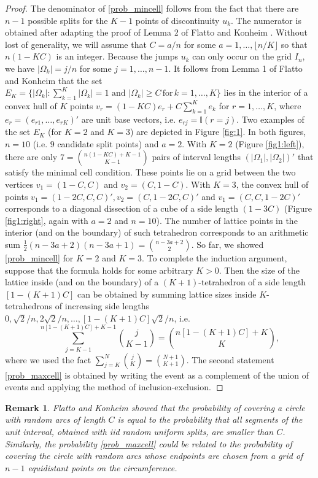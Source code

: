 \documentclass{article}
\newcommand{\1}{\mathbb{I}}
\newtheorem{remark}{Remark}[section]
\theoremstyle{assumption}
\begin{document}
\begin{proof}
The denominator of \eqref{prob_mincell} follows from the fact that there are $n-1$ possible splits for the $K-1$ points of discontinuity $u_k$.
The numerator is obtained after adapting the proof of Lemma 2 of Flatto and Konheim \cite{flatto_konheim}.
Without lost of generality, we will assume that $C=a/n$ for some $a=1,\dots,\lfloor n/K\rfloor$ so that $n(1-KC)$ is an integer. Because the  jumps $u_k$ can only occur on the grid $I_n$, we have
$|\Omega_k|=j/n$ for some $j=1,\dots,n-1$. It follows from Lemma 1 of Flatto and Konheim \cite{flatto_konheim} that the 
set $E_K=\{|\Omega_k|:\sum_{k=1}^{K}|\Omega_k|=1\,\,\text{and}\,\, |\Omega_k|\geq C\,\text{for}\,k=1,\dots,K\}$ lies in the interior of a convex hull of $K$ points
$v_r=(1-KC)e_r+C\sum_{k=1}^Ke_k$ for  $r=1,\dots, K$, where $e_r=(e_{r1},\dots,e_{rK})'$ are unit base vectors, i.e. $e_{rj}=\mathbb{I}(r=j)$.
Two examples of the set $E_K$ (for $K=2$ and $K=3$) are depicted in Figure \ref{fig:1}. In both figures,  $n=10$ (i.e. $9$ candidate split points)  and $a=2$. With $K=2$ (Figure \ref{fig1:left}),  there are  
only $7= {{n(1-KC)+K-1} \choose {K-1}}$ pairs of interval lengths $(|\Omega_1|,|\Omega_2|)'$ that satisfy the minimal cell condition. These points lie on a grid between the two vertices $v_1=(1-C,C)$ and $v_2=(C,1-C)$.
With $K=3$, the convex hull of points $v_1=(1-2C,C,C)',v_2=(C,1-2C,C)'$ and $v_1=(C,C,1-2C)'$ corresponds to a diagonal dissection of a cube of a side length $(1-3C)$ (Figure \ref{fig1:right}, again  with $a=2$ and $n=10$). 
The number of lattice points in the interior (and on the boundary) of such tetrahedron corresponds to an arithmetic sum $\frac{1}{2}{(n-3a+2)(n-3a+1)}={{n-3a+2}\choose 2}$. 
So far, we showed \eqref{prob_mincell} for $K=2$ and $K=3$.  To complete the induction argument, suppose that the formula holds for some arbitrary $K>0$.  Then  the size of the lattice inside (and on the boundary) of a 
$(K+1)$-tetrahedron of a side length $[1-(K+1)C]$ can be obtained by summing lattice sizes inside $K$-tetrahedrons of increasing side lengths {$0,\sqrt{2}/n, 2\sqrt{2}/n ,\dots,[1-(K+1)C]\sqrt{2}/n$}, i.e.
$$
\sum_{j=K-1}^{n[1-(K+1)C]+K-1}{j\choose K-1}={n[1-(K+1)C]+K \choose K},
$$
where we used the fact $\sum_{j=K}^N{j\choose K}={N+1 \choose K+1}$. The second statement \eqref{prob_maxcell} is obtained by writing the event as a complement of the union of events and applying  the method of inclusion-exclusion.$\qedhere$
\end{proof}
\begin{remark}
Flatto and Konheim \cite{flatto_konheim} showed that the probability of covering a circle with random arcs of length $C$ is equal to the probability that all segments of the unit interval, obtained with iid random uniform splits, are smaller than $C$. Similarly, the probability \eqref{prob_maxcell} could be related to the probability of covering the circle with random arcs whose endpoints are chosen from a grid of $n-1$ equidistant points on the circumference.
\end{remark}
\end{document}
